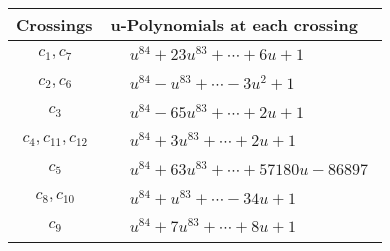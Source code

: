 \documentclass[1p]{elsarticle_modified}
\theoremstyle{definition}
\begin{document}
\begin{tabular}{m{50pt}|m{274pt}}
Crossings & \hspace{64pt}u-Polynomials at each crossing \\
\hline $$\begin{aligned}c_{1},c_{7}\end{aligned}$$&$\begin{aligned}
&u^{84}+23 u^{83}+\cdots+6 u+1
\end{aligned}$\\
\hline $$\begin{aligned}c_{2},c_{6}\end{aligned}$$&$\begin{aligned}
&u^{84}- u^{83}+\cdots-3 u^2+1
\end{aligned}$\\
\hline $$\begin{aligned}c_{3}\end{aligned}$$&$\begin{aligned}
&u^{84}-65 u^{83}+\cdots+2 u+1
\end{aligned}$\\
\hline $$\begin{aligned}c_{4},c_{11},c_{12}\end{aligned}$$&$\begin{aligned}
&u^{84}+3 u^{83}+\cdots+2 u+1
\end{aligned}$\\
\hline $$\begin{aligned}c_{5}\end{aligned}$$&$\begin{aligned}
&u^{84}+63 u^{83}+\cdots+57180 u-86897
\end{aligned}$\\
\hline $$\begin{aligned}c_{8},c_{10}\end{aligned}$$&$\begin{aligned}
&u^{84}+u^{83}+\cdots-34 u+1
\end{aligned}$\\
\hline $$\begin{aligned}c_{9}\end{aligned}$$&$\begin{aligned}
&u^{84}+7 u^{83}+\cdots+8 u+1
\end{aligned}$\\
\hline
\end{tabular}\\~\\
\newpage\renewcommand{\arraystretch}{1}
\end{document}
